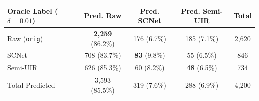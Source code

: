 \documentclass[runningheads]{llncs}
\begin{document}
\begin{table}[t]
{\begin{tabular}{l c c c c}
            Oracle Label ($\delta = 0.01$) & Pred. Raw                 & Pred. SCNet         & Pred. Semi-UIR                      & Total   \\
            \midrule
            Raw (\texttt{orig})            & \textbf{2{,}259} (86.2\%) & 176 (6.7\%)         & 185 (7.1\%)                         & 2{,}620 \\
            SCNet                          & 708 (83.7\%)              & \textbf{83} (9.8\%) & 55 (6.5\%)                          & 846     \\
            Semi-UIR                       & 626 (85.3\%)              & 60 (8.2\%)          & \textbf{48} (6.5\%)                 & 734     \\
            \midrule
            Total Predicted                & 3{,}593 (85.5\%)          & 319 (7.6\%)         & 288 (6.9\%)                         & 4{,}200 \\
            \bottomrule
        \end{tabular}
    }
\end{table}
\end{document}
